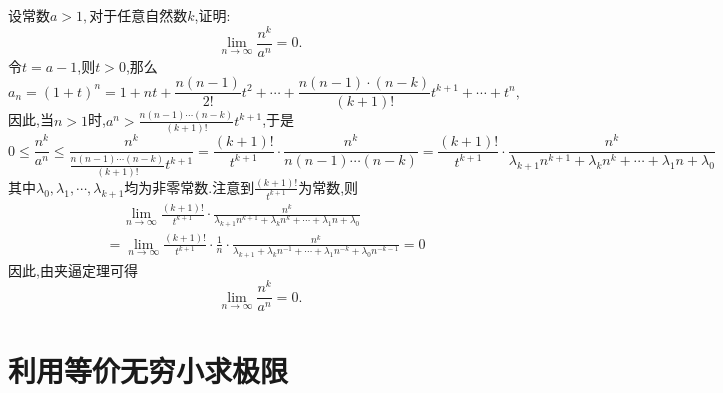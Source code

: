\examples 设常数$a>1,$对于任意自然数$k$,证明:
\begin{equation*}
\lim\limits_{n \to \infty}\frac{n^k}{a^n}=0.
\end{equation*}
\hspace*{-0.5em}\proof 令$t=a-1$,则$t>0$,那么
\[
a_n=(1+t)^n=1+nt+\frac{n(n-1)}{2!}t^2+\cdots+\frac{n(n-1)\cdot(n-k)}{(k+1)!}t^{k+1}+\cdots+t^n,
\]
因此,当$n>1$时,$\displaystyle a^n>\frac{n(n-1)\cdots(n-k)}{(k+1)!}t^{k+1}$,于是
\[
0 \le \frac{n^k}{a^n}\le \frac{n^k}{\displaystyle \frac{n(n-1)\cdots(n-k)}{(k+1)!}t^{k+1}}=\frac{(k+1)!}{t^{k+1}}\cdot \frac{n^k}{n(n-1)\cdots(n-k)}=\frac{(k+1)!}{t^{k+1}}\cdot\frac{n^k}{\lambda_{k+1}n^{k+1}+\lambda_kn^k+\cdots+\lambda_1n+\lambda_0}
\]
其中$\lambda_0,\lambda_1,\cdots,\lambda_{k+1}$均为非零常数.注意到$\displaystyle \frac{(k+1)!}{t^{k+1}}$为常数,则
\begin{equation*}
\begin{split}
&\quad \, \lim\limits_{n \to \infty}\frac{(k+1)!}{t^{k+1}}\cdot\frac{n^k}{\lambda_{k+1}n^{k+1}+\lambda_kn^k+\cdots+\lambda_1n+\lambda_0}\\
&=\lim\limits_{n \to \infty}\frac{(k+1)!}{t^{k+1}}\cdot\frac{1}{n}\cdot \frac{n^k}{\lambda_{k+1}+\lambda_kn^{-1}+\cdots+\lambda_1n^{-k}+\lambda_0n^{-k-1}}=0
\end{split}
\end{equation*}
因此,由夹逼定理可得
\begin{equation*}
\lim\limits_{n \to \infty}\frac{n^k}{a^n}=0.
\end{equation*}

\section{利用等价无穷小求极限}
